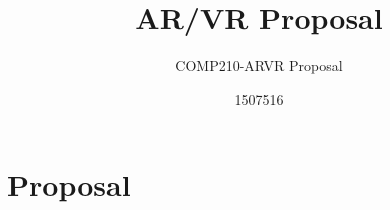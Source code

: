 \documentclass{scrartcl}
\title{AR/VR Proposal }
\subtitle{COMP210-ARVR Proposal}
\author{1507516}
\begin{document}
\maketitle

\section{Proposal}
\end{document}
